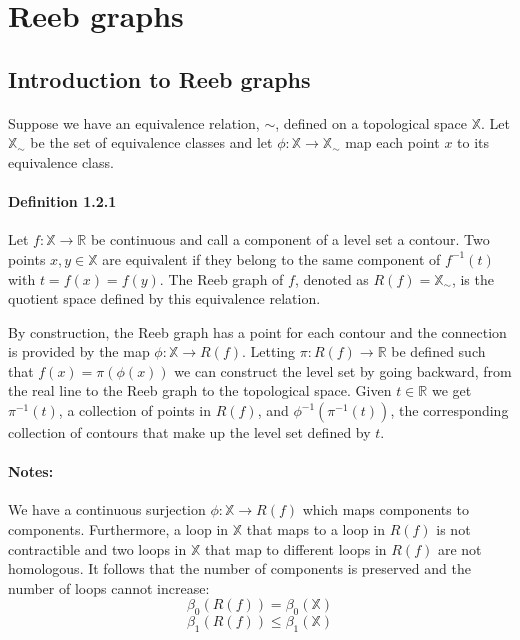 \documentclass[]{article}
\newcommand{\R}{\mathbb{R}}
\newcommand{\X}{\mathbb{X}}
\begin{document}
\newpage
\section{Reeb graphs}
     \subsection{Introduction to Reeb graphs}
     \paragraph{}
      Suppose we have an equivalence relation, $\sim$, defined on a topological space $\X$. Let $\X_\sim$
      be the set of equivalence classes and let $\phi : \X \to \X_\sim$ map each point $x$ to its equivalence class.

     \paragraph{\textbf{Definition 1.2.1}}
      Let $f: \X \to \R$ be continuous and call a component of a level set a contour. Two
      points $x,y \in \X$ are equivalent if they belong to the same component of $f^{-1}(t)$
      with $t=f(x)=f(y)$. The Reeb graph of $f$, denoted as $R(f)=\X_\sim$, is the quotient space 
      defined by this equivalence relation.

      By construction, the Reeb graph has a point for each contour and the connection is 
      provided by the map $\phi:\X\to R(f)$. Letting $\pi:R(f)\to\R$ be defined such that $f(x)=\pi(\phi(x))$
      we can construct the level set by going backward, from the real line to the Reeb graph to the 
      topological space. Given $t\in\R$ we get $\pi^{-1}(t)$, a collection of points in $R(f)$,
      and $\phi^{-1}(\pi^{-1}(t))$, the corresponding collection of contours that make up the level set defined by $t$.

      \paragraph{Notes:}We have a continuous surjection $\phi:\X\to R(f)$ which maps components 
      to components. Furthermore, a loop in $\X$ that maps to a loop in $R(f)$ is not contractible
      and two loops in $\X$ that map to different loops in $R(f)$ are not homologous. It follows
      that the number of components is preserved and the number of loops cannot increase:
      $$
      \beta_0(R(f))=\beta_0(\X)
      $$
      $$
      \beta_1(R(f))\le\beta_1(\X)
      $$
\end{document}

